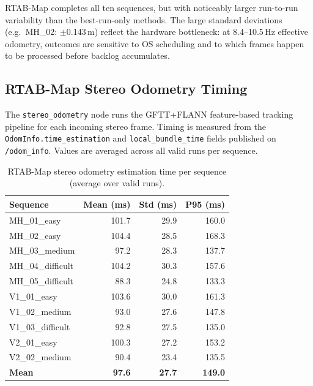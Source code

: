 \documentclass[11pt]{article}
\begin{document}
RTAB-Map completes all ten sequences, but with noticeably larger run-to-run variability than the best-run-only methods. The large standard deviations (e.g.\ MH\_02: $\pm$0.143\,m) reflect the hardware bottleneck: at 8.4--10.5\,Hz effective odometry, outcomes are sensitive to OS scheduling and to which frames happen to be processed before backlog accumulates.

\subsection{RTAB-Map Stereo Odometry Timing}

The \texttt{stereo\_odometry} node runs the GFTT+FLANN feature-based tracking pipeline for each incoming stereo frame. Timing is measured from the \texttt{OdomInfo.time\_estimation} and \texttt{local\_bundle\_time} fields published on \texttt{/odom\_info}. Values are averaged across all valid runs per sequence.

\begin{table}[H]
\centering
\small
\caption{RTAB-Map stereo odometry estimation time per sequence (average over valid runs).}
\label{tab:rtabmap_timing_odom}
\begin{tabular}{lrrr}
\toprule
Sequence & Mean (ms) & Std (ms) & P95 (ms) \\
\midrule
MH\_01\_easy       & 101.7 & 29.9 & 160.0 \\
MH\_02\_easy       & 104.4 & 28.5 & 168.3 \\
MH\_03\_medium     & 97.2  & 28.3 & 137.7 \\
MH\_04\_difficult  & 104.2 & 30.3 & 157.6 \\
MH\_05\_difficult  & 88.3  & 24.8 & 133.3 \\
V1\_01\_easy       & 103.6 & 30.0 & 161.3 \\
V1\_02\_medium     & 93.0  & 27.6 & 147.8 \\
V1\_03\_difficult  & 92.8  & 27.5 & 135.0 \\
V2\_01\_easy       & 100.3 & 27.2 & 153.2 \\
V2\_02\_medium     & 90.4  & 23.4 & 135.5 \\
\midrule
\textbf{Mean}      & \textbf{97.6} & \textbf{27.7} & \textbf{149.0} \\
\bottomrule
\end{tabular}
\end{table}
\end{document}

